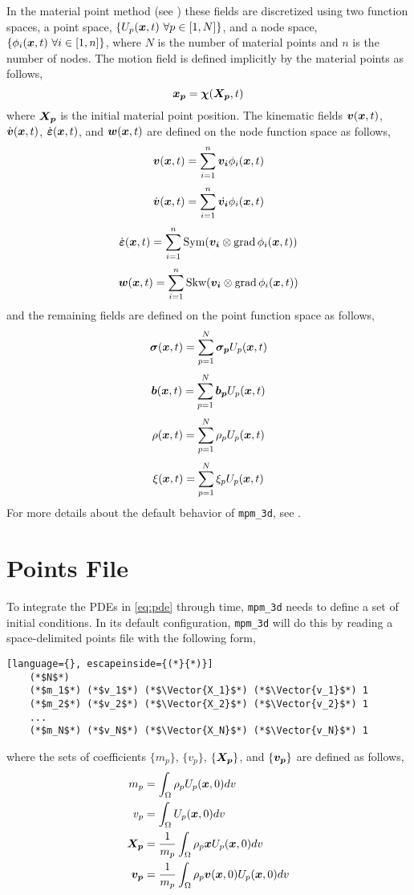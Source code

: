In the material point method (see \cite{sulsky1994}) these fields are discretized using two function spaces, a point space, \(\{U_p(\boldsymbol{x},t)\ \forall p \in [1,N]\}\), and a node space, \(\{\phi_i(\Vector{x},t)\ \forall i \in [1,n]\}\), where \(N\) is the number of material points and \(n\) is the number of nodes. The motion field is defined implicitly by the material points as follows,
\[\boldsymbol{x_p} = \boldsymbol{\chi}(\boldsymbol{X_p},t)\]
where \(\boldsymbol{X_p}\) is the initial material point position. The kinematic fields \(\boldsymbol{v}(\boldsymbol{x},t)\), \(\dot{\boldsymbol{v}}(\boldsymbol{x},t)\), \(\dot{\boldsymbol{\varepsilon}}(\boldsymbol{x},t)\), and \(\boldsymbol{w}(\boldsymbol{x},t)\) are defined on the node function space as follows,
\[\boldsymbol{v}(\boldsymbol{x},t) = \sum_{i=1}^{n} \boldsymbol{v_i} \phi_i(\boldsymbol{x},t)\]
\[\dot{\boldsymbol{v}}(\boldsymbol{x},t) = \sum_{i=1}^{n} \dot{\boldsymbol{v_i}} \phi_i(\boldsymbol{x},t)\]
\[\dot{\boldsymbol{\varepsilon}}(\boldsymbol{x},t) = \sum_{i=1}^{n} \operatorname{Sym}(\boldsymbol{v_i} \otimes \operatorname{grad}{\phi_i(\boldsymbol{x},t)})\]
\[\boldsymbol{w}(\boldsymbol{x},t) = \sum_{i=1}^{n} \operatorname{Skw}(\boldsymbol{v_i} \otimes \operatorname{grad}{\phi_i(\boldsymbol{x},t)})\]
and the remaining fields are defined on the point function space as follows,
\[\boldsymbol{\sigma}(\boldsymbol{x},t) = \sum_{p=1}^{N} \boldsymbol{\sigma_p} U_p(\boldsymbol{x},t)\]
\[\boldsymbol{b}(\boldsymbol{x},t) = \sum_{p=1}^{N} \boldsymbol{b_p} U_p(\boldsymbol{x},t)\]
\[\rho(\boldsymbol{x},t) = \sum_{p=1}^{N} \rho_p U_p(\boldsymbol{x},t)\]
\[\xi(\boldsymbol{x},t) = \sum_{p=1}^{N} \xi_p U_p(\boldsymbol{x},t)\]
For more details about the default behavior of \texttt{mpm\_3d}, see \cite{dunatunga2017}.


\section{Points File}
To integrate the PDEs in \eqref{eq:pde} through time, \texttt{mpm\_3d} needs to define a set of initial conditions. In its default configuration, \texttt{mpm\_3d} will do this by reading a space-delimited points file with the following form,
\begin{lstlisting}[language={}, escapeinside={(*}{*)}]
    (*$N$*)
    (*$m_1$*) (*$v_1$*) (*$\Vector{X_1}$*) (*$\Vector{v_1}$*) 1
    (*$m_2$*) (*$v_2$*) (*$\Vector{X_2}$*) (*$\Vector{v_2}$*) 1
    ...
    (*$m_N$*) (*$v_N$*) (*$\Vector{X_N}$*) (*$\Vector{v_N}$*) 1
\end{lstlisting}
where the sets of coefficients \(\{m_p\}\), \(\{v_p\}\), \(\{\boldsymbol{X_p}\}\), and \(\{\boldsymbol{v_p}\}\) are defined as follows,
\[
\begin{aligned}
m_p &= \int_{\Omega}{\rho_p U_p(\boldsymbol{x},0) dv}
\\v_p &= \int_{\Omega}{U_p(\boldsymbol{x},0) dv}
\\\boldsymbol{X_p} &= \frac{1}{m_p}\int_{\Omega}{\rho_p \boldsymbol{x} U_p(\boldsymbol{x},0) dv}
\\\boldsymbol{v_p} &= \frac{1}{m_p}\int_{\Omega}{\rho_p \boldsymbol{v}(\boldsymbol{x},0) U_p(\boldsymbol{x},0) dv}
\end{aligned}
\]

